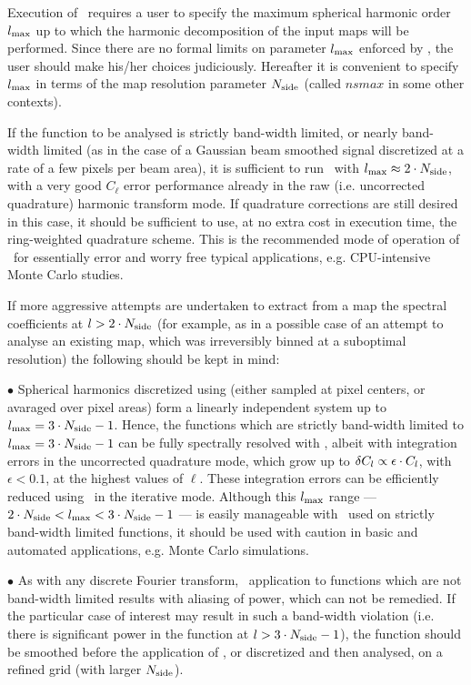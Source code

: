 \begin{recommend}
{Execution of \thedocid\ requires a user to specify the maximum 
spherical harmonic order $l_{\mathrm{max}}$ up to which the harmonic 
decomposition of the input maps will be performed.
Since there are no formal limits on parameter
$l_{\mathrm{max}}$ enforced by \thedocid, the user should make his/her choices
judiciously. 
Hereafter it is convenient to specify $l_{\mathrm{max}}$  
in terms of the \healpix
map resolution parameter $N_{\mathrm{side}}$ (called $nsmax$ in some other contexts).

If the function to be analysed is strictly  band-width
limited, or nearly band-width limited (as in the case of 
a Gaussian beam smoothed signal discretized at a rate of a few pixels
per beam area), it is  sufficient to run \thedocid\ with
$l_{\mathrm{max}} \approx 2\cdot N_{\mathrm{side}}$, with a very good $C_\ell$ 
error performance 
already in the raw (i.e. uncorrected quadrature) harmonic transform mode. 
If quadrature 
corrections are still desired in this case, it should be sufficient to use, at no
extra cost in execution time, the ring-weighted quadrature scheme. 
This is the recommended mode of operation of \thedocid\ for essentially
error and worry free typical applications, e.g. CPU-intensive 
Monte Carlo studies. 

If more aggressive attempts are undertaken to extract from a map 
the spectral coefficients at $l > 2\cdot N_{\mathrm{side}}$ (for example, as 
in a possible case of an attempt to analyse an existing map, which was 
irreversibly binned  at a suboptimal resolution) 
the following should be kept in mind:

$\bullet$ Spherical harmonics discretized using \healpix 
(either sampled at
pixel centers, or avaraged over pixel areas) form a linearly independent
system up to $l_{\mathrm{max}} = 3 \cdot N_{\mathrm{side}} -1$. Hence, the functions which are
strictly band-width limited to $l_{\mathrm{max}} = 3 \cdot N_{\mathrm{side}} - 1 $ 
can be fully
spectrally resolved with \thedocid, albeit with integration errors
in the uncorrected quadrature mode, which grow up to 
$\delta C_l \propto \epsilon \cdot C_l$, with $\epsilon <0.1$, 
at the highest values of $\ell$. These integration  errors 
can be efficiently 
reduced
using \thedocid\ in the iterative mode. Although this $l_{\mathrm{max}}$ range
--- $2 \cdot N_{\mathrm{side}} < l_{\mathrm{max}} < 3 \cdot N_{\mathrm{side}} - 1$ --- is easily
manageable with \thedocid\ used on strictly band-width limited functions,
it should be used with caution in basic and automated applications, e.g.
Monte Carlo simulations.

$\bullet$ As with any discrete Fourier transform, \thedocid\ application to
functions which are not band-width limited results with aliasing
of power, which can not be remedied. If the particular case of interest
may result in such a band-width violation (i.e. there is significant power
in the function at $l > 3 \cdot N_{\mathrm{side}} -1$), the function should
be smoothed before the application of \thedocid, or discretized and
then analysed, on a refined \healpix grid (with larger $N_{\mathrm{side}}$).

}
\end{recommend}
